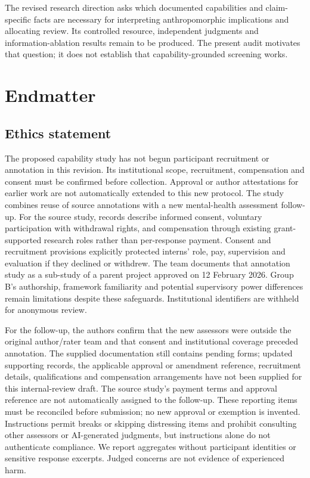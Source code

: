 \documentclass[manuscript,screen,review,anonymous]{acmart}
\begin{document}
The revised research direction asks which documented capabilities and claim-specific facts are necessary for interpreting anthropomorphic implications and allocating review. Its controlled resource, independent judgments and information-ablation results remain to be produced. The present audit motivates that question; it does not establish that capability-grounded screening works.

\clearpage
\section*{Endmatter}
\subsection*{Ethics statement}
The proposed capability study has not begun participant recruitment or annotation in this revision. Its institutional scope, recruitment, compensation and consent must be confirmed before collection. Approval or author attestations for earlier work are not automatically extended to this new protocol.
The study combines reuse of source annotations with a new mental-health assessment follow-up. For the source study, records describe informed consent, voluntary participation with withdrawal rights, and compensation through existing grant-supported research roles rather than per-response payment. Consent and recruitment provisions explicitly protected interns' role, pay, supervision and evaluation if they declined or withdrew. The team documents that annotation study as a sub-study of a parent project approved on 12 February 2026. Group B's authorship, framework familiarity and potential supervisory power differences remain limitations despite these safeguards. Institutional identifiers are withheld for anonymous review.

For the follow-up, the authors confirm that the new assessors were outside the original author/rater team and that consent and institutional coverage preceded annotation. The supplied documentation still contains pending forms; updated supporting records, the applicable approval or amendment reference, recruitment details, qualifications and compensation arrangements have not been supplied for this internal-review draft. The source study's payment terms and approval reference are not automatically assigned to the follow-up. These reporting items must be reconciled before submission; no new approval or exemption is invented. Instructions permit breaks or skipping distressing items and prohibit consulting other assessors or AI-generated judgments, but instructions alone do not authenticate compliance. We report aggregates without participant identities or sensitive response excerpts. Judged concerns are not evidence of experienced harm.
\end{document}
